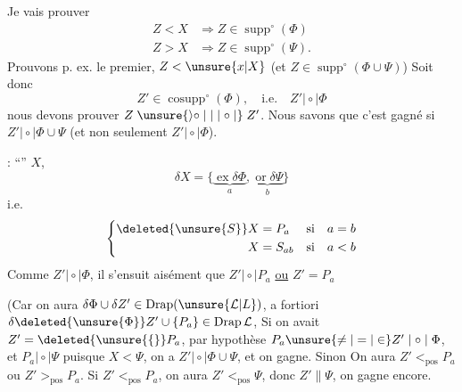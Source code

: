 Je vais prouver
\[
\begin{aligned}
Z<X&\Longrightarrow Z\in\operatorname{supp}^{\circ}(\Phi)\\
Z>X&\Longrightarrow Z\in\operatorname{supp}^{\circ}(\Psi).
\end{aligned}
\]
 Prouvons p. ex. le premier, $Z<\unsure{x|X}$ (et  $Z\in\operatorname{supp}^{\circ}(\Phi\cup\Psi)$)
Soit donc
\[
Z'\in\operatorname{cosupp}^{\circ}(\Phi),\quad\text{i.e.}\quad Z'\mathrel{\mid\circ\mid}\Phi
\]
nous  devons prouver $Z\mathrel{\unsure{\rangle\circ\mid|\mid\circ\mid}}Z'$. Nous  savons que c'est gagné si $Z'\mathrel{\mid\circ\mid}\Phi\cup\Psi$  (et non seulement $Z'\mathrel{\mid\circ\mid}\Phi$).


 : ``'' $X$, 
\[
\delta X=\{\underbrace{\operatorname{ex}\delta\Phi}_{a},\underbrace{\operatorname{or}\delta\Psi}_{b}\}
\]
i.e.
\[
\left\{\begin{aligned}
\deleted{\unsure{S}}X&=P_a&&\text{si}\quad a=b\\
X&=S_{ab}&&\text{si}\quad a<b
\end{aligned}\right.
\]
 Comme $Z'\mathrel{\mid\circ\mid}\Phi$, il s'ensuit aisément que $Z'\mathrel{\mid\circ\mid}P_a$ \uline{ou} $Z'=P_a$ 


(Car on aura $\delta\Phi\cup\delta Z'\in\operatorname{Drap}(\unsure{\mathcal{L}|L})$, a fortiori $\delta\deleted{\unsure{\Phi}}Z'\cup\{P_a\}\in\operatorname{Drap}\mathcal{L}$,  Si on avait $Z'=\deleted{\unsure{\{}}P_a$,  par hypothèse $P_a\unsure{\ne|=|\in}Z'\mathrel{\mid\circ\mid}\Phi$, et $P_a\mathrel{\mid\circ\mid}\Psi$ puisque $X<\Psi$, on a $Z'\mathrel{\mid\circ\mid}\Phi\cup\Psi$, et on gagne. Sinon On aura $Z'<_{\mathrm{pos}}P_a$ ou $Z'>_{\mathrm{pos}}P_a$. Si $Z'<_{\mathrm{pos}}P_a$, on aura $Z'<_{\mathrm{pos}}\Psi$, donc $Z'\parallel\Psi$, on gagne encore.

